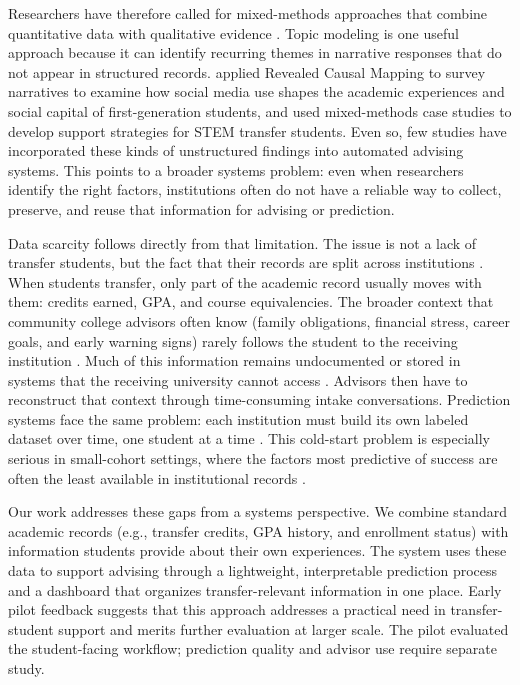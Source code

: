 \documentclass[letterpaper,11pt]{article}
\begin{document}
Researchers have therefore called for mixed-methods approaches that combine quantitative data with qualitative evidence \parencite{nguyen2025school}. Topic modeling is one useful approach because it can identify recurring themes in narrative responses that do not appear in structured records. \textcite{deng2021} applied Revealed Causal Mapping to survey narratives to examine how social media use shapes the academic experiences and social capital of first-generation students, and \textcite{thiry2023} used mixed-methods case studies to develop support strategies for STEM transfer students. Even so, few studies have incorporated these kinds of unstructured findings into automated advising systems. This points to a broader systems problem: even when researchers identify the right factors, institutions often do not have a reliable way to collect, preserve, and reuse that information for advising or prediction.

Data scarcity follows directly from that limitation. The issue is not a lack of transfer students, but the fact that their records are split across institutions \parencite{roksa2008credits}. When students transfer, only part of the academic record usually moves with them: credits earned, GPA, and course equivalencies. The broader context that community college advisors often know (family obligations, financial stress, career goals, and early warning signs) rarely follows the student to the receiving institution \parencite{nguyen2024community}. Much of this information remains undocumented or stored in systems that the receiving university cannot access \parencite{preposttransfer2014}. Advisors then have to reconstruct that context through time-consuming intake conversations. Prediction systems face the same problem: each institution must build its own labeled dataset over time, one student at a time \parencite{coleman2019coldstart}. This cold-start problem is especially serious in small-cohort settings, where the factors most predictive of success are often the least available in institutional records \parencite{coleman2019coldstart}.

Our work addresses these gaps from a systems perspective. We combine standard academic records (e.g., transfer credits, GPA history, and enrollment status) with information students provide about their own experiences. The system uses these data to support advising through a lightweight, interpretable prediction process and a dashboard that organizes transfer-relevant information in one place. Early pilot feedback suggests that this approach addresses a practical need in transfer-student support and merits further evaluation at larger scale. The pilot evaluated the student-facing workflow; prediction quality and advisor use require separate study.
\end{document}
